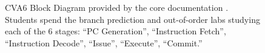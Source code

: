 
\begin{figure}[t]
    \centering
    \caption[
        CVA6 Block Diagram
    ]{
        CVA6 Block Diagram provided by the core documentation \cite{cva6}. Students spend the branch prediction and out-of-order labs studying each of the 6 stages: \enquote{PC Generation}, \enquote{Instruction Fetch}, \enquote{Instruction Decode}, \enquote{Issue}, \enquote{Execute}, \enquote{Commit.}
    }
    \label{fig:cva6_overview}
\end{figure}
